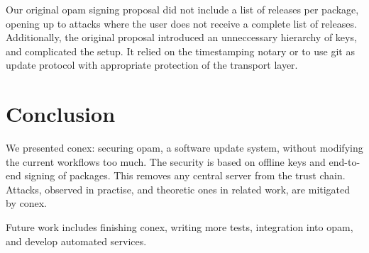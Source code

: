 \documentclass[nocopyrightspace]{sigplanconf}
\begin{document}
Our original opam signing proposal did not include a list of releases per package, opening up to attacks where the user does not receive a complete list of releases.
Additionally, the original proposal introduced an unneccessary hierarchy of keys, and complicated the setup.
It relied on the timestamping notary or to use git as update protocol with appropriate protection of the transport layer.

\section{Conclusion} \label{sec:conclusion}
We presented conex: securing opam, a software update system, without modifying the current workflows too much.
The security is based on offline keys and end-to-end signing of packages.
This removes any central server from the trust chain.
Attacks, observed in practise, and theoretic ones in related work, are mitigated by conex.

Future work includes finishing conex, writing more tests, integration into opam, and develop automated services.



\end{document}
